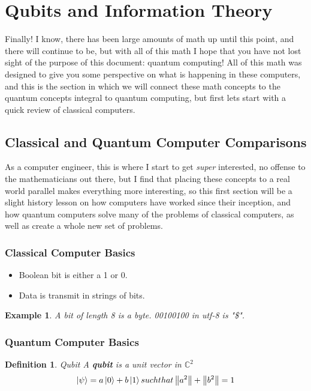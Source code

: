 \documentclass[12pt]{article}
\theoremstyle{plain}
\theoremstyle{nonumberplain}
\theoremstyle{plain}
\newtheorem{definition}[lemma]{Definition}
\newtheorem{example}[lemma]{Example}
\theoremstyle{nonumberplain}
\newcommand\1{{\bf 1}}
\newcommand{\C}{\mathbb{C}} %
\newcommand{\<}{\left\langle}
\renewcommand{\>}{\right\rangle}
\newcommand{\norm}[1]{\left\lVert#1\right\rVert} %
\begin{document}
\pagebreak

\section{Qubits and Information Theory}
Finally! I know, there has been large amounts of math up until this point, and there will continue to be, but with all of this math I hope that you have not lost sight of the purpose of this document: quantum computing!  All of this math was designed to give you some perspective on what is happening in these computers, and this is the section in which we will connect these math concepts to the quantum concepts integral to quantum computing, but first lets start with a quick review of classical computers.

\subsection{Classical and Quantum Computer Comparisons}
As a computer engineer, this is where I start to get \textit{super} interested, no offense to the mathematicians out there, but I find that placing these concepts to a real world parallel makes everything more interesting, so this first section will be a slight history lesson on how computers have worked since their inception, and how quantum computers solve many of the problems of classical computers, as well as create a whole new set of problems.

\subsubsection{Classical Computer Basics}
\begin{itemize}
\item Boolean bit is either a 1 or 0.
\item Data is transmit in strings of bits.
\end{itemize}

\begin{example} A bit of length 8 is a byte.
00100100 in utf-8 is "\$". \smiley{} 
\end{example}

\subsubsection{Quantum Computer Basics}
\begin{definition} Qubit
A \textbf{qubit} is a unit vector in $\C^2$ 
\begin{equation}
\ket{\psi} = a\ket{0} + b\ket{1} such that \norm{a^2} + \norm{b^2} = 1
\end{equation}
\end{definition}
\end{document}
